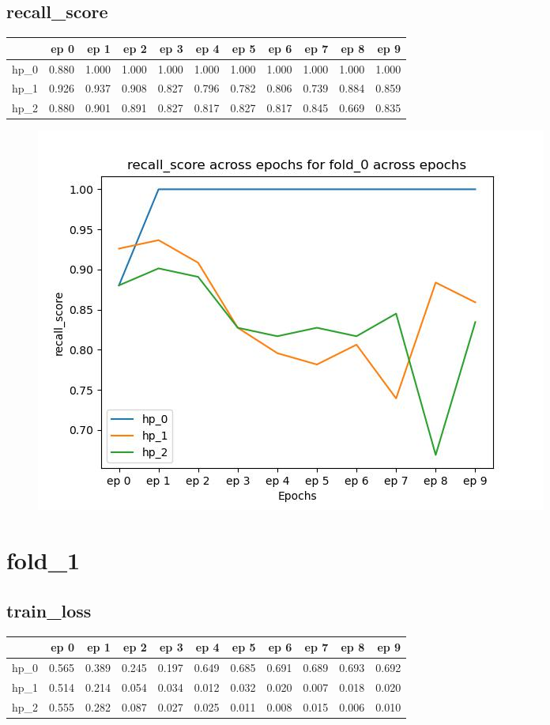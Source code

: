 \documentclass{article}
\begin{document}
\subsection{recall\_score}
\begin{tabular}{lrrrrrrrrrr}
\toprule
{} &   ep 0 &   ep 1 &   ep 2 &   ep 3 &   ep 4 &   ep 5 &   ep 6 &   ep 7 &   ep 8 &   ep 9 \\
\midrule
hp\_0 &  0.880 &  1.000 &  1.000 &  1.000 &  1.000 &  1.000 &  1.000 &  1.000 &  1.000 &  1.000 \\
hp\_1 &  0.926 &  0.937 &  0.908 &  0.827 &  0.796 &  0.782 &  0.806 &  0.739 &  0.884 &  0.859 \\
hp\_2 &  0.880 &  0.901 &  0.891 &  0.827 &  0.817 &  0.827 &  0.817 &  0.845 &  0.669 &  0.835 \\
\bottomrule
\end{tabular}

\begin{figure}[H]
\includegraphics[scale = 0.75]{fold_0/recall_score}
\end{figure}
\section{fold\_1}
\subsection{train\_loss}
\begin{tabular}{lrrrrrrrrrr}
\toprule
{} &   ep 0 &   ep 1 &   ep 2 &   ep 3 &   ep 4 &   ep 5 &   ep 6 &   ep 7 &   ep 8 &   ep 9 \\
\midrule
hp\_0 &  0.565 &  0.389 &  0.245 &  0.197 &  0.649 &  0.685 &  0.691 &  0.689 &  0.693 &  0.692 \\
hp\_1 &  0.514 &  0.214 &  0.054 &  0.034 &  0.012 &  0.032 &  0.020 &  0.007 &  0.018 &  0.020 \\
hp\_2 &  0.555 &  0.282 &  0.087 &  0.027 &  0.025 &  0.011 &  0.008 &  0.015 &  0.006 &  0.010 \\
\bottomrule
\end{tabular}
\end{document}
